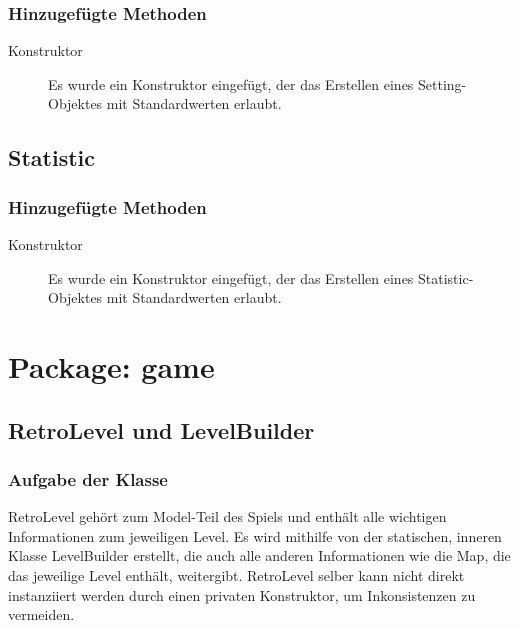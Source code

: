 \documentclass[parskip=full]{scrreprt}
\begin{document}
\subsubsection{Hinzugefügte Methoden}
\begin{description}
	\item[Konstruktor] Es wurde ein Konstruktor eingefügt, der das Erstellen eines Setting-Objektes mit Standardwerten erlaubt.
	
\end{description}

\subsection{Statistic}

\subsubsection{Hinzugefügte Methoden}
\begin{description}
	\item[Konstruktor] Es wurde ein Konstruktor eingefügt, der das Erstellen eines Statistic-Objektes mit Standardwerten erlaubt.
\end{description}

\section{Package: game}

\subsection{RetroLevel und LevelBuilder}

\subsubsection{Aufgabe der Klasse}

\begin{description}
	\item RetroLevel gehört zum Model-Teil des Spiels und enthält alle wichtigen Informationen zum jeweiligen Level. Es wird mithilfe von der statischen, inneren Klasse LevelBuilder erstellt, die auch alle anderen Informationen wie die Map, die das jeweilige Level enthält, weitergibt. RetroLevel selber kann nicht direkt instanziiert werden durch einen privaten Konstruktor, um Inkonsistenzen zu vermeiden.
\end{description}
\end{document}
